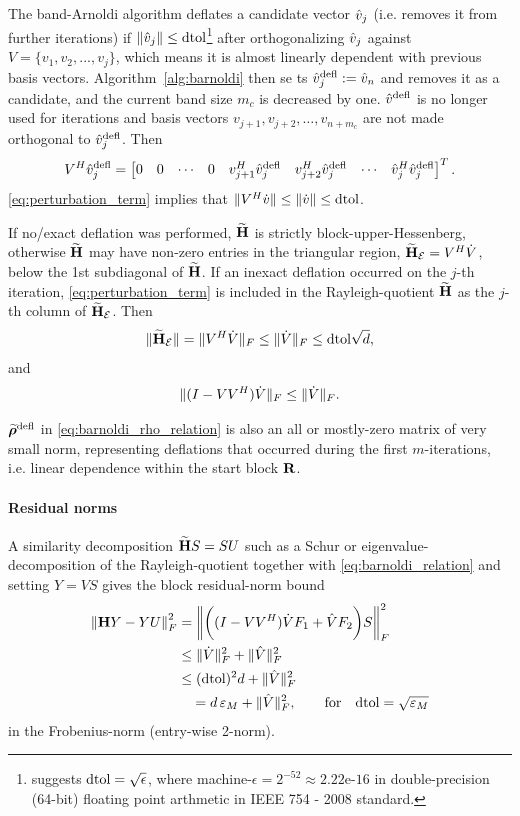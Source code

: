 The band-Arnoldi algorithm deflates a candidate vector $\vh_j$ (i.e. removes it from further iterations) if $\| \vh_j \|\leq \dtol$\footnote{\cite{parlett1979lanczos} suggests $\dtol =\sqrt{\epsilon}$, where machine-$\epsilon = 2^{-52} \approx 2.22\text{e-16}$ in double-precision (64-bit) floating point arthmetic in IEEE 754 - 2008 standard.}  after orthogonalizing $\vh_j$  against $V=\{v_1,v_2,...,v_j\}$, which means it is almost linearly dependent with previous basis vectors.  Algorithm~\ref{alg:barnoldi} then se ts $\vh^\defl_j:=\vh_n$ and removes it as a candidate, and the current band size $m_c$ is decreased by one.   $\vh^\defl$ is no longer used for iterations and basis vectors $v_{j+1},v_{j+2},\ldots,v_{n+m_c}$ are not made orthogonal to  $\vh_j^\defl$.   Then 
\begin{equation}
\c{V} \vh_j^\defl= \mat{0&0&\cdots&0&\c{v_{j+1}}\vh_j^\defl&  \c{v_{j+2}}\vh_j^\defl&\cdots&\c{\vh_j}\vh_j^\defl}^T.
\label{eq:perturbation_term}
\end{equation}
\eqref{eq:perturbation_term} implies that $\| \c{V} \vd \| \leq \| \vd\| \leq \dtol$.

If no/exact deflation was performed,  $\Himp$ is strictly block-upper-Hessenberg, otherwise $\Himp$ may have non-zero entries in the triangular region, $\Himp_\mathcal{E}=\c{V}\Vd$, below the 1st subdiagonal of $\Himp$.     
If an inexact deflation occurred on the $j$-th iteration, \eqref{eq:perturbation_term} is included in 
the Rayleigh-quotient $\Himp$ as the $j$-th column of $\Himp_\mathcal{E}$.  
Then 
\begin{equation}
\|\Himp_\mathcal{E} \| = \| \c{V}\Vd  \|_F \leq \| \Vd\|_F  \leq \dtol \sqrt{d}, 
\end{equation}
and
\begin{equation}
\| (I-V\c{V}) \Vd \|_F \leq\| \Vd\|_F . 
\label{eq:vdot_norm_bound}
\end{equation}



\smallskip
$\rrimp^\defl$ in \eqref{eq:barnoldi_rho_relation} is also an all or mostly-zero matrix of very small norm, representing deflations that occurred during the first $m$-iterations, i.e. linear dependence within the start block $\RR$.   






\paragraph{Residual norms}
A similarity decomposition $\Himp S = S U$ such as a Schur or eigenvalue-decomposition of the Rayleigh-quotient together with  \eqref{eq:barnoldi_relation} and setting $Y=V S$ gives the block residual-norm bound
 \begin{align*}
\nrm{F}{\H Y - Y U}^2 &=\nrm{F}{\bigg( (I-V\c{V})\Vd F_1+ \Vh F_2 \bigg)S}^2\nonumber\\
&\leq \| \Vd \|^2_F + \| \Vh \|^2_F\nonumber\\
&\leq (\dtol)^2 d + \| \Vh \|^2_F\\
&\quad = d\,\varepsilon_M + \| \Vh \|^2_F,  \qquad\text{for}\quad\dtol=\sqrt{\varepsilon_M} 
\end{align*}
in the Frobenius-norm (entry-wise 2-norm).  

